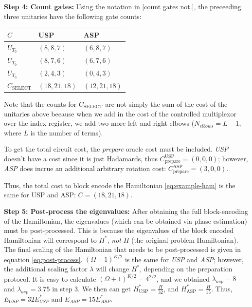 \textbf{Step 4: Count gates:} Using the notation in \ref{count gates not.}, the preceeding three unitaries have the following gate counts:

\begin{center}
    \begin{tabular}{ |p{3cm}||p{3cm}|p{3cm}|}
        \hline
        $C$& USP &ASP\\
        \hline
        $U_{T_0}$   & $(8, 8, 7)$    &$(6, 8, 7)$\\
        $U_{T_0}$   & $(8, 7, 6)$    &$(6, 7, 6)$\\
        $U_{T_0}$   & $(2, 4, 3)$    &$(0, 4, 3)$\\
        \hline
        $C_{\text{SELECT}}$ & $(18, 21, 18)$ &$(12, 21, 18)$\\
        \hline
       \end{tabular}
\end{center}

Note that the counts for $C_{\text{SELECT}}$ are not simply the sum of the cost of the unitaries above because when we add in the cost of the controlled multiplexor over the index register, we add two more left and right elbows ($N_{elbows} = L - 1$, where $L$ is the number of terms). 

To get the total circuit cost, the \textit{prepare} oracle cost must be included. \textit{USP} doesn't have a cost since it is just Hadamards, thus $C^{\text{USP}}_{\text{prepare}} = (0, 0, 0)$; however, \textit{ASP} does incrue an additional arbitrary rotation cost: $C_{\text{prepare}}^{\text{ASP}} = (3, 0, 0)$. 

Thus, the total cost to block encode the Hamiltonian \ref{eq:example-ham} is the same for USP and ASP: $C = (18, 21, 18)$.

\textbf{Step 5: Post-process the eigenvalues:} After obtaining the full block-encoding of the Hamiltonian, the eigenvalues (which can be obtained via phase estimation) must be post-processed. This is because the eigenvalues of the block encoded Hamiltonian will correspond to $H^*$, \textit{not} $H$ (the original problem Hamiltonian).
The final scaling of the Hamiltonian that needs to be post-processed is given in equation \ref{eq:post-process}. $(\Omega + 1)^{K / 2}$ is the same for \textit{USP} and \textit{ASP}; however, the additional scaling factor $\lambda$ will change $H^*$, depending on the preparation protocol. It is easy to calculate $(\Omega + 1)^{K/2} = 4^{2/2}$, and we obtained $\lambda_{usp} = 8$ and $\lambda_{asp} = 3.75$ in step 3. 
We then can get $H^*_{\text{USP}} = \frac{H}{32}$, and $H^*_{\text{ASP}} = \frac{H}{15}$. Thus, $E_{USP} = 32E^*_{USP}$ and $E_{ASP} = 15E^*_{ASP}$.